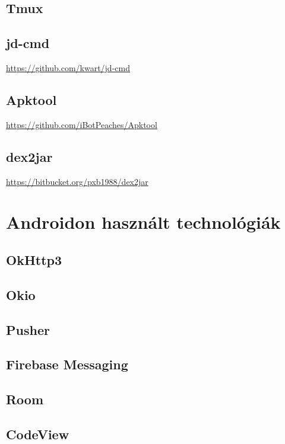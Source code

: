 \documentclass{thesis-ekf}
\theoremstyle{definition}
\theoremstyle{remark}
\begin{document}
\subsection{Tmux}

\subsection{jd-cmd}

\url{https://github.com/kwart/jd-cmd}

\subsection{Apktool}

\url{https://github.com/iBotPeaches/Apktool}

\subsection{dex2jar}

\url{https://bitbucket.org/pxb1988/dex2jar}

\section{Androidon használt technológiák}

\subsection{OkHttp3}

\subsection{Okio}

\subsection{Pusher}

\subsection{Firebase Messaging}

\subsection{Room}

\subsection{CodeView}
\end{document}
